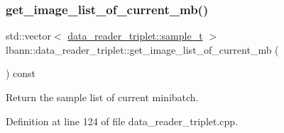 \subsubsection{\texorpdfstring{get\+\_\+image\+\_\+list\+\_\+of\+\_\+current\+\_\+mb()}{get\_image\_list\_of\_current\_mb()}}
{\footnotesize\ttfamily std\+::vector$<$ \hyperlink{classlbann_1_1data__reader__triplet_adddc55e0424d38b60ac5f55c16990bb7}{data\+\_\+reader\+\_\+triplet\+::sample\+\_\+t} $>$ lbann\+::data\+\_\+reader\+\_\+triplet\+::get\+\_\+image\+\_\+list\+\_\+of\+\_\+current\+\_\+mb (\begin{DoxyParamCaption}{ }\end{DoxyParamCaption}) const}



Return the sample list of current minibatch. 



Definition at line 124 of file data\+\_\+reader\+\_\+triplet.\+cpp.



